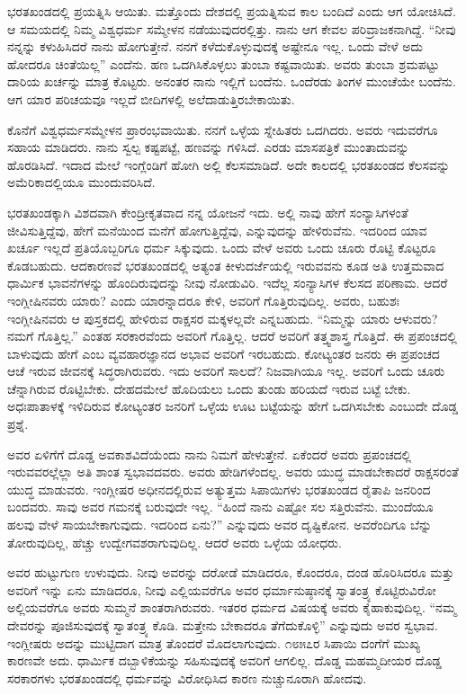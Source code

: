 ಭರತಖಂಡದಲ್ಲಿ ಪ್ರಯತ್ನಿಸಿ ಆಯಿತು. ಮತ್ತೊಂದು ದೇಶದಲ್ಲಿ ಪ್ರಯತ್ನಿಸುವ ಕಾಲ ಬಂದಿದೆ ಎಂದು ಆಗ ಯೋಚಿಸಿದೆ. ಆ ಸಮಯದಲ್ಲಿ ನಿಮ್ಮ ವಿಶ್ವಧರ್ಮ ಸಮ್ಮೇಳನ ನಡೆಯುವುದರಲ್ಲಿತ್ತು. ನಾನು ಆಗ ಕೇವಲ ಪರಿವ್ರಾಜಕನಾಗಿದ್ದೆ. “ನೀವು ನನ್ನನ್ನು ಕಳುಹಿಸಿದರೆ ನಾನು ಹೋಗುತ್ತೇನೆ. ನನಗೆ ಕಳೆದುಕೊಳ್ಳುವುದಕ್ಕೆ ಅಷ್ಟೇನೂ ಇಲ್ಲ. ಒಂದು ವೇಳೆ ಅದು ಹೋದರೂ ಚಿಂತೆಯಿಲ್ಲ” ಎಂದೆನು. ಹಣ ಒದಗಿಸಿಕೊಳ್ಳಲು ತುಂಬಾ ಕಷ್ಟವಾಯಿತು. ಅವರು ತುಂಬಾ ಶ್ರಮಪಟ್ಟು ದಾರಿಯ ಖರ್ಚನ್ನು ಮಾತ್ರ ಕೊಟ್ಟರು. ಅನಂತರ ನಾನು ಇಲ್ಲಿಗೆ ಬಂದೆನು. ಒಂದೆರಡು ತಿಂಗಳ ಮುಂಚೆಯೇ ಬಂದೆನು. ಆಗ ಯಾರ ಪರಿಚಯವೂ ಇಲ್ಲದೆ ಬೀದಿಗಳಲ್ಲಿ ಅಲೆದಾಡುತ್ತಿರಬೇಕಾಯಿತು.

ಕೊನೆಗೆ ವಿಶ್ವಧರ್ಮಸಮ್ಮೇಳನ ಪ್ರಾರಂಭವಾಯಿತು. ನನಗೆ ಒಳ್ಳೆಯ ಸ್ನೇಹಿತರು ಒದಗಿದರು. ಅವರು ಇದುವರೆಗೂ ಸಹಾಯ ಮಾಡಿದರು. ನಾನು ಸ್ವಲ್ಪ ಕಷ್ಟಪಟ್ಟೆ, ಹಣವನ್ನು ಗಳಿಸಿದೆ. ಎರಡು ಮಾಸಪತ್ರಿಕೆ ಮುಂತಾದುವನ್ನು ಹೊರಡಿಸಿದೆ. ಇದಾದ ಮೇಲೆ ಇಂಗ್ಲೆಂಡಿಗೆ ಹೋಗಿ ಅಲ್ಲಿ ಕೆಲಸಮಾಡಿದೆ. ಅದೇ ಕಾಲದಲ್ಲಿ ಭರತಖಂಡದ ಕೆಲಸವನ್ನು ಅಮೆರಿಕಾದಲ್ಲಿಯೂ ಮುಂದುವರಿಸಿದೆ.

ಭರತಖಂಡಕ್ಕಾಗಿ ವಿಶದವಾಗಿ ಕೇಂದ್ರೀಕೃತವಾದ ನನ್ನ ಯೋಜನೆ ಇದು. ಅಲ್ಲಿ ನಾವು ಹೇಗೆ ಸಂನ್ಯಾಸಿಗಳಂತೆ ಜೀವಿಸುತ್ತಿದ್ದೆವು, ಹೇಗೆ ಮನೆಯಿಂದ ಮನೆಗೆ ಹೋಗುತ್ತಿದ್ದೆವು, ಎನ್ನುವುದನ್ನು ಹೇಳಿರುವೆನು. ಇದರಿಂದ ಯಾವ ಖರ್ಚೂ ಇಲ್ಲದೆ ಪ್ರತಿಯೊಬ್ಬರಿಗೂ ಧರ್ಮ ಸಿಕ್ಕುವುದು. ಒಂದು ವೇಳೆ ಅವರು ಒಂದು ಚೂರು ರೊಟ್ಟಿ ಕೊಟ್ಟರೂ ಕೊಡಬಹುದು. ಆದಕಾರಣವೆ ಭರತಖಂಡದಲ್ಲಿ ಅತ್ಯಂತ ಕೀಳುದರ್ಜೆಯಲ್ಲಿ ಇರುವವನು ಕೂಡ ಅತಿ ಉತ್ತಮವಾದ ಧಾರ್ಮಿಕ ಭಾವನೆಗಳನ್ನು ಹೊಂದಿರುವುದನ್ನು ನೀವು ನೋಡುವಿರಿ. ಇದೆಲ್ಲ ಸಂನ್ಯಾಸಿಗಳ ಕೆಲಸದ ಪರಿಣಾಮ. ಆದರೆ ಇಂಗ್ಲೀಷಿನವರು ಯಾರು? ಎಂದು ಯಾರನ್ನಾದರೂ ಕೇಳಿ, ಅವರಿಗೆ ಗೊತ್ತಿರುವುದಿಲ್ಲ. ಅವರು, ಬಹುಶಃ ಇಂಗ್ಲೀಷಿನವರು ಆ ಪುಸ್ತಕದಲ್ಲಿ ಹೇಳಿರುವ ರಾಕ್ಷಸರ ಮಕ್ಕಳಲ್ಲವೇ ಎನ್ನಬಹುದು. “ನಿಮ್ಮನ್ನು ಯಾರು ಆಳುವರು? ನಮಗೆ ಗೊತ್ತಿಲ್ಲ.” ಎಂತಹ ಸರಕಾರವೆಂದು ಅವರಿಗೆ ಗೊತ್ತಿಲ್ಲ. ಆದರೆ ಅವರಿಗೆ ತತ್ತ್ವಶಾಸ್ತ್ರ ಗೊತ್ತಿದೆ. ಈ ಪ್ರಪಂಚದಲ್ಲಿ ಬಾಳುವುದು ಹೇಗೆ ಎಂಬ ವ್ಯವಹಾರಜ್ಞಾನದ ಅಭಾವ ಅವರಿಗೆ ಇರಬಹುದು. ಕೋಟ್ಯಂತರ ಜನರು ಈ ಪ್ರಪಂಚದ ಆಚೆ ಇರುವ ಜೀವನಕ್ಕೆ ಸಿದ್ಧರಾಗಿರುವರು. ಇದು ಅವರಿಗೆ ಸಾಲದೆ? ನಿಜವಾಗಿಯೂ ಇಲ್ಲ. ಅವರಿಗೆ ಒಂದು ಚೂರು ಚೆನ್ನಾಗಿರುವ ರೊಟ್ಟಿಬೇಕು. ದೇಹದಮೇಲೆ ಹೊದಿಯಲು ಒಂದು ತುಂಡು ಹರಿಯದೆ ಇರುವ ಬಟ್ಟೆ ಬೇಕು. ಅಧಃಪಾತಾಳಕ್ಕೆ ಇಳಿದಿರುವ ಕೋಟ್ಯಂತರ ಜನರಿಗೆ ಒಳ್ಳೆಯ ಊಟ ಬಟ್ಟೆಯನ್ನು ಹೇಗೆ ಒದಗಿಸಬೇಕು ಎಂಬುದೇ ದೊಡ್ಡ ಪ್ರಶ್ನೆ.

ಅವರ ಏಳಿಗೆಗೆ ದೊಡ್ಡ ಅವಕಾಶವಿದೆಯೆಂದು ನಾನು ನಿಮಗೆ ಹೇಳುತ್ತೇನೆ. ಏಕೆಂದರೆ ಅವರು ಪ್ರಪಂಚದಲ್ಲಿ ಇರುವವರಲ್ಲೆಲ್ಲಾ ಅತಿ ಶಾಂತ ಸ್ವಭಾವದವರು. ಅವರು ಹೇಡಿಗಳೆಂದಲ್ಲ. ಅವರು ಯುದ್ಧ ಮಾಡಬೇಕಾದರೆ ರಾಕ್ಷಸರಂತೆ ಯುದ್ಧ ಮಾಡುವರು. ಇಂಗ್ಲೀಷರ ಅಧೀನದಲ್ಲಿರುವ ಅತ್ಯುತ್ತಮ ಸಿಪಾಯಿಗಳು ಭರತಖಂಡದ ರೈತಾಪಿ ಜನರಿಂದ ಬಂದವರು. ಸಾವು ಅವರ ಗಮನಕ್ಕೆ ಬರುವುದೇ ಇಲ್ಲ. “ಹಿಂದೆ ನಾನು ಎಷ್ಟೋ ಸಲ ಸತ್ತಿರುವೆನು. ಮುಂದೆಯೂ ಹಲವು ವೇಳೆ ಸಾಯಬೇಕಾಗುವುದು. ಇದರಿಂದ ಏನು?” ಎನ್ನುವುದು ಅವರ ದೃಷ್ಟಿಕೋನ. ಅವರೆಂದಿಗೂ ಬೆನ್ನು ತೋರುವುದಿಲ್ಲ, ಹೆಚ್ಚು ಉದ್ವೇಗವಶರಾಗುವುದಿಲ್ಲ. ಆದರೆ ಅವರು ಒಳ್ಳೆಯ ಯೋಧರು.

ಅವರ ಹುಟ್ಟುಗುಣ ಉಳುವುದು. ನೀವು ಅವರನ್ನು ದರೋಡೆ ಮಾಡಿದರೂ, ಕೊಂದರೂ, ದಂಡ ಹೊರಿಸಿದರೂ ಮತ್ತು ಅವರಿಗೆ ಇನ್ನು ಏನು ಮಾಡಿದರೂ, ನೀವು ಎಲ್ಲಿಯವರೆಗೂ ಅವರ ಧರ್ಮಾನುಷ್ಠಾನಕ್ಕೆ ಸ್ವಾತಂತ್ರ್ಯ ಕೊಟ್ಟಿರುವಿರೋ ಅಲ್ಲಿಯವರೆಗೂ ಅವರು ಸುಮ್ಮನೆ ಶಾಂತರಾಗಿರುವರು. ಇತರರ ಧರ್ಮದ ವಿಷಯಕ್ಕೆ ಅವರು ಕೈಹಾಕುವುದಿಲ್ಲ. “ನಮ್ಮ ದೇವರನ್ನು ಪೂಜಿಸುವುದಕ್ಕೆ ಸ್ವಾತಂತ್ರ್ಯ ಕೊಡಿ. ಮತ್ತೇನು ಬೇಕಾದರೂ ತೆಗೆದುಕೊಳ್ಳಿ” ಎನ್ನುವುದು ಅವರ ಸ್ವಭಾವ. ಇಂಗ್ಲೀಷರು ಅದನ್ನು ಮುಟ್ಟಿದಾಗ ಮಾತ್ರ ತೊಂದರೆ ಮೊದಲಾಗುವುದು. ೧೮೫೭ರ ಸಿಪಾಯಿ ದಂಗೆಗೆ ಮುಖ್ಯ ಕಾರಣವೇ ಅದು. ಧಾರ್ಮಿಕ ದಬ್ಬಾಳಿಕೆಯನ್ನು ಸಹಿಸುವುದಕ್ಕೆ ಅವರಿಗೆ ಆಗಲಿಲ್ಲ. ದೊಡ್ಡ ಮಹಮ್ಮದೀಯರ ದೊಡ್ಡ ಸರಕಾರಗಳು ಭರತಖಂಡದಲ್ಲಿ ಧರ್ಮವನ್ನು ವಿರೋಧಿಸಿದ ಕಾರಣ ನುಚ್ಚುನೂರಾಗಿ ಹೋದವು.

